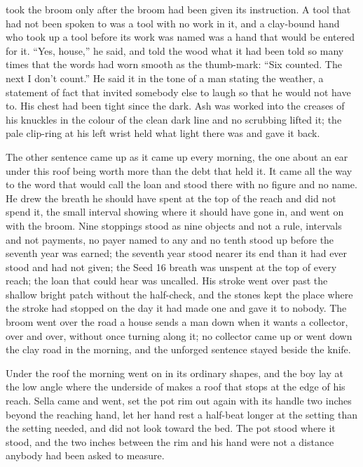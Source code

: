  took the broom only after the broom had been given its instruction. A tool that had not been spoken to was a tool with no work in it, and a clay-bound hand who took up a tool before its work was named was a hand that would be entered for it. “Yes, house,” he said, and told the wood what it had been told so many times that the words had worn smooth as the thumb-mark: “Six counted. The next I don't count.” He said it in the tone of a man stating the weather, a statement of fact that invited somebody else to laugh so that he would not have to. His chest had been tight since the dark. Ash was worked into the creases of his knuckles in the colour of the clean dark line and no scrubbing lifted it; the pale clip-ring at his left wrist held what light there was and gave it back.

The other sentence came up as it came up every morning, the one about an ear under this roof being worth more than the debt that held it. It came all the way to the word that would call the loan and stood there with no figure and no name. He drew the breath he should have spent at the top of the reach and did not spend it, the small interval showing where it should have gone in, and went on with the broom. Nine stoppings stood as nine objects and not a rule, intervals and not payments, no payer named to any and no tenth stood up before the seventh year was earned; the seventh year stood nearer its end than it had ever stood and had not given; the Seed 16 breath was unspent at the top of every reach; the loan that could hear was uncalled. His stroke went over  past the shallow bright patch without the half-check, and the stones kept the place where the stroke had stopped on the day it had made one and gave it to nobody. The broom went over the road a house sends a man down when it wants a collector, over and over, without once turning along it; no collector came up or went down the clay road in the morning, and the unforged sentence stayed beside the knife.

\scenebreak

Under the roof the morning went on in its ordinary shapes, and the boy lay at the low angle where the underside of  makes a roof that stops at the edge of his reach. Sella came and went, set the pot rim out again with its handle two inches beyond the reaching hand, let her hand rest a half-beat longer at the setting than the setting needed, and did not look toward the bed. The pot stood where it stood, and the two inches between the rim and his hand were not a distance anybody had been asked to measure.

